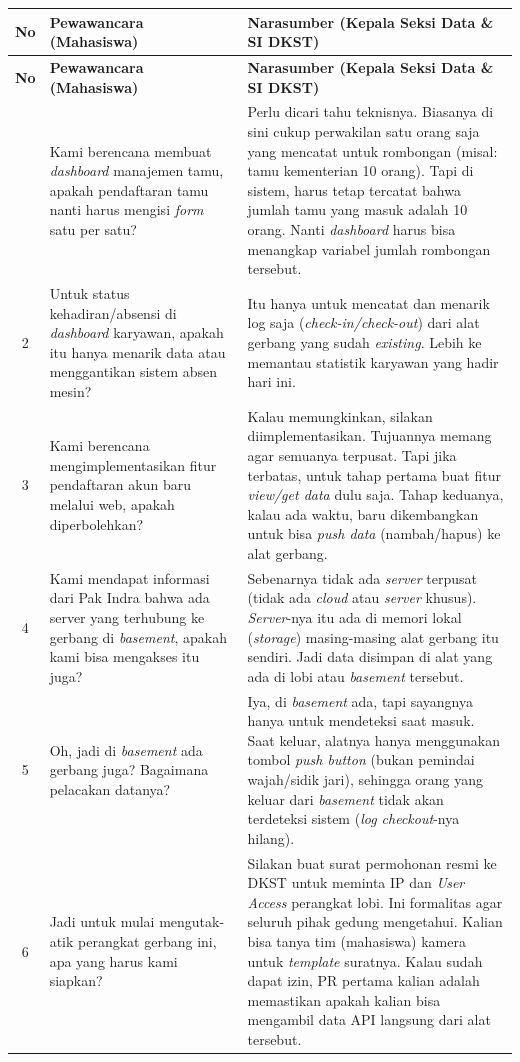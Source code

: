 \begin{longtable}{|c|p{}|p{}|}
\hline
\textbf{No} & \textbf{Pewawancara (Mahasiswa)} & \textbf{Narasumber (Kepala Seksi Data \& SI DKST)} \\ \hline
\endfirsthead
\hline
\textbf{No} & \textbf{Pewawancara (Mahasiswa)} & \textbf{Narasumber (Kepala Seksi Data \& SI DKST)} \\ \hline
\endhead
\hline
\endfoot
\hline
\endlastfoot
1 & Kami berencana membuat \textit{dashboard} manajemen tamu, apakah pendaftaran tamu nanti harus mengisi \textit{form} satu per satu? & Perlu dicari tahu teknisnya. Biasanya di sini cukup perwakilan satu orang saja yang mencatat untuk rombongan (misal: tamu kementerian 10 orang). Tapi di sistem, harus tetap tercatat bahwa jumlah tamu yang masuk adalah 10 orang. Nanti \textit{dashboard} harus bisa menangkap variabel jumlah rombongan tersebut. \\ \hline
2 & Untuk status kehadiran/absensi di \textit{dashboard} karyawan, apakah itu hanya menarik data atau menggantikan sistem absen mesin? & Itu hanya untuk mencatat dan menarik log saja (\textit{check-in/check-out}) dari alat gerbang yang sudah \textit{existing}. Lebih ke memantau statistik karyawan yang hadir hari ini. \\ \hline
3 & Kami berencana mengimplementasikan fitur pendaftaran akun baru melalui web, apakah diperbolehkan? & Kalau memungkinkan, silakan diimplementasikan. Tujuannya memang agar semuanya terpusat. Tapi jika terbatas, untuk tahap pertama buat fitur \textit{view/get data} dulu saja. Tahap keduanya, kalau ada waktu, baru dikembangkan untuk bisa \textit{push data} (nambah/hapus) ke alat gerbang. \\ \hline
4 & Kami mendapat informasi dari Pak Indra bahwa ada server yang terhubung ke gerbang di \textit{basement}, apakah kami bisa mengakses itu juga? & Sebenarnya tidak ada \textit{server} terpusat (tidak ada \textit{cloud} atau \textit{server} khusus). \textit{Server}-nya itu ada di memori lokal (\textit{storage}) masing-masing alat gerbang itu sendiri. Jadi data disimpan di alat yang ada di lobi atau \textit{basement} tersebut. \\ \hline
5 & Oh, jadi di \textit{basement} ada gerbang juga? Bagaimana pelacakan datanya? & Iya, di \textit{basement} ada, tapi sayangnya hanya untuk mendeteksi saat masuk. Saat keluar, alatnya hanya menggunakan tombol \textit{push button} (bukan pemindai wajah/sidik jari), sehingga orang yang keluar dari \textit{basement} tidak akan terdeteksi sistem (\textit{log checkout}-nya hilang). \\ \hline
6 & Jadi untuk mulai mengutak-atik perangkat gerbang ini, apa yang harus kami siapkan? & Silakan buat surat permohonan resmi ke DKST untuk meminta IP dan \textit{User Access} perangkat lobi. Ini formalitas agar seluruh pihak gedung mengetahui. Kalian bisa tanya tim (mahasiswa) kamera untuk \textit{template} suratnya. Kalau sudah dapat izin, PR pertama kalian adalah memastikan apakah kalian bisa mengambil data API langsung dari alat tersebut. \\ \hline
\end{longtable}
